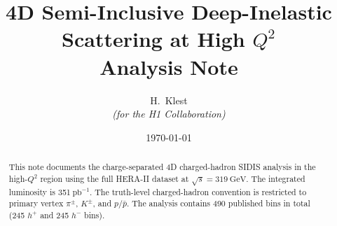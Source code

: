 \documentclass[11pt,a4paper]{article}
\newcommand{\Qsq}{Q^{2}}
\newcommand{\hplus}{h^{+}}
\newcommand{\hminus}{h^{-}}
\newcommand{\rts}{\sqrt{s}}
\newcommand{\GeV}{\ensuremath{\text{GeV}}}
\newcommand{\pbinv}{\ensuremath{\text{pb}^{-1}}}
\begin{document}

\title{4D Semi-Inclusive Deep-Inelastic Scattering
       at High $\Qsq$\\[0.3em]
       \large Analysis Note}
\author{H.~Klest \\ \textit{(for the H1 Collaboration)}}
\date{\today}
\maketitle

\begin{abstract}
This note documents the charge-separated 4D charged-hadron SIDIS
analysis in the high-$\Qsq$ region using the full HERA-II dataset at $\rts=319~\GeV$.  The integrated luminosity is 351$~\pbinv$. The truth-level charged-hadron convention is restricted to primary vertex
$\pi^{\pm}$, $K^{\pm}$, and $p/\bar p$. The analysis contains 490 published bins in total
(245 $\hplus$ and 245 $\hminus$ bins).
\end{abstract}

\tableofcontents
\newpage









%






\begin{appendices}



\end{appendices}




\end{document}
